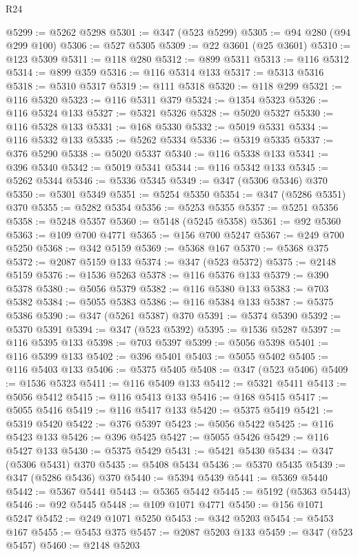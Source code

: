 \begin{lexlean}{R24}
\begin{coremodule}
@5299 := @5262 @5298
@5301 := @347 (@523 @5299)
@5305 := @94 @280 (@94 @299 @100)
@5306 := @527 @5305
@5309 := @22 @3601 (@25 @3601)
@5310 := @123 @5309
@5311 := @118 @280
@5312 := @899 @5311
@5313 := @116 @5312
@5314 := @899 @359
@5316 := @116 @5314 @133
@5317 := @5313 @5316
@5318 := @5310 @5317
@5319 := @111 @5318
@5320 := @118 @299
@5321 := @116 @5320
@5323 := @116 @5311 @379
@5324 := @1354 @5323
@5326 := @116 @5324 @133
@5327 := @5321 @5326
@5328 := @5020 @5327
@5330 := @116 @5328 @133
@5331 := @168 @5330
@5332 := @5019 @5331
@5334 := @116 @5332 @133
@5335 := @5262 @5334
@5336 := @5319 @5335
@5337 := @376 @5290
@5338 := @5020 @5337
@5340 := @116 @5338 @133
@5341 := @396 @5340
@5342 := @5019 @5341
@5344 := @116 @5342 @133
@5345 := @5262 @5344
@5346 := @5336 @5345
@5349 := @347 (@5306 @5346) @370
@5350 := @5301 @5349
@5351 := @5254 @5350
@5354 := @347 (@5286 @5351) @370
@5355 := @5282 @5354
@5356 := @5253 @5355
@5357 := @5251 @5356
@5358 := @5248 @5357
@5360 := @5148 (@5245 @5358)
@5361 := @92 @5360
@5363 := @109 @700 @4771
@5365 := @156 @700 @5247
@5367 := @249 @700 @5250
@5368 := @342 @5159
@5369 := @5368 @167
@5370 := @5368 @375
@5372 := @2087 @5159 @133
@5374 := @347 (@523 @5372)
@5375 := @2148 @5159
@5376 := @1536 @5263
@5378 := @116 @5376 @133
@5379 := @390 @5378
@5380 := @5056 @5379
@5382 := @116 @5380 @133
@5383 := @703 @5382
@5384 := @5055 @5383
@5386 := @116 @5384 @133
@5387 := @5375 @5386
@5390 := @347 (@5261 @5387) @370
@5391 := @5374 @5390
@5392 := @5370 @5391
@5394 := @347 (@523 @5392)
@5395 := @1536 @5287
@5397 := @116 @5395 @133
@5398 := @703 @5397
@5399 := @5056 @5398
@5401 := @116 @5399 @133
@5402 := @396 @5401
@5403 := @5055 @5402
@5405 := @116 @5403 @133
@5406 := @5375 @5405
@5408 := @347 (@523 @5406)
@5409 := @1536 @5323
@5411 := @116 @5409 @133
@5412 := @5321 @5411
@5413 := @5056 @5412
@5415 := @116 @5413 @133
@5416 := @168 @5415
@5417 := @5055 @5416
@5419 := @116 @5417 @133
@5420 := @5375 @5419
@5421 := @5319 @5420
@5422 := @376 @5397
@5423 := @5056 @5422
@5425 := @116 @5423 @133
@5426 := @396 @5425
@5427 := @5055 @5426
@5429 := @116 @5427 @133
@5430 := @5375 @5429
@5431 := @5421 @5430
@5434 := @347 (@5306 @5431) @370
@5435 := @5408 @5434
@5436 := @5370 @5435
@5439 := @347 (@5286 @5436) @370
@5440 := @5394 @5439
@5441 := @5369 @5440
@5442 := @5367 @5441
@5443 := @5365 @5442
@5445 := @5192 (@5363 @5443)
@5446 := @92 @5445
@5448 := @109 @1071 @4771
@5450 := @156 @1071 @5247
@5452 := @249 @1071 @5250
@5453 := @342 @5203
@5454 := @5453 @167
@5455 := @5453 @375
@5457 := @2087 @5203 @133
@5459 := @347 (@523 @5457)
@5460 := @2148 @5203

\end{coremodule}
\end{lexlean}
